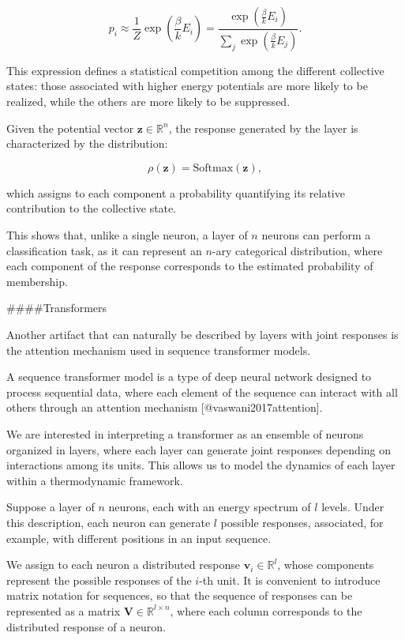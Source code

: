 \documentclass[12pt]{article}
\begin{document}
\begin{equation}
p_i \approx \frac{1}{Z} \exp\left(\frac{\beta}{k} E_i\right)  
= \frac{\exp\left(\frac{\beta}{k} E_i\right)}{\sum_j \exp\left(\frac{\beta}{k} E_j\right)}.
\end{equation}

This expression defines a statistical competition among the different collective states: those associated with higher energy potentials are more likely to be realized, while the others are more likely to be suppressed.

Given the potential vector $\mathbf{z} \in \mathbb{R}^n$, the response generated by the layer is characterized by the distribution:

\begin{equation}
\rho(\mathbf{z}) = \text{Softmax}(\mathbf{z}),
\end{equation}

which assigns to each component a probability quantifying its relative contribution to the collective state.

This shows that, unlike a single neuron, a layer of $n$ neurons can perform a classification task, as it can represent an $n$-ary categorical distribution, where each component of the response corresponds to the estimated probability of membership.

####Transformers

Another artifact that can naturally be described by layers with joint responses is the attention mechanism used in sequence transformer models.

A sequence transformer model is a type of deep neural network designed to process sequential data, where each element of the sequence can interact with all others through an attention mechanism [@vaswani2017attention].

We are interested in interpreting a transformer as an ensemble of neurons organized in layers, where each layer can generate joint responses depending on interactions among its units. This allows us to model the dynamics of each layer within a thermodynamic framework.

Suppose a layer of $n$ neurons, each with an energy spectrum of $l$ levels. Under this description, each neuron can generate $l$ possible responses, associated, for example, with different positions in an input sequence.

We assign to each neuron a distributed response $\mathbf{v}_i \in \mathbb{R}^l$, whose components represent the possible responses of the $i$-th unit. It is convenient to introduce matrix notation for sequences, so that the sequence of responses can be represented as a matrix $\mathbf{V} \in \mathbb{R}^{l \times n}$, where each column corresponds to the distributed response of a neuron.
\end{document}
